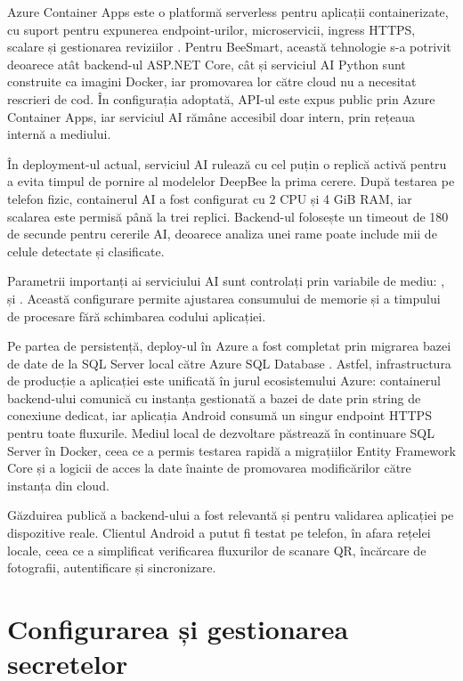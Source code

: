 Azure Container Apps este o platformă serverless pentru aplicații containerizate, cu suport pentru expunerea endpoint-urilor, microservicii, ingress HTTPS, scalare și gestionarea reviziilor \cite{azureContainerAppsDocs}. Pentru BeeSmart, această tehnologie s-a potrivit deoarece atât backend-ul ASP.NET Core, cât și serviciul AI Python sunt construite ca imagini Docker, iar promovarea lor către cloud nu a necesitat rescrieri de cod. În configurația adoptată, API-ul este expus public prin Azure Container Apps, iar serviciul AI rămâne accesibil doar intern, prin rețeaua internă a mediului.

În deployment-ul actual, serviciul AI rulează cu cel puțin o replică activă pentru a evita timpul de pornire al modelelor DeepBee la prima cerere. După testarea pe telefon fizic, containerul AI a fost configurat cu 2 CPU și 4 GiB RAM, iar scalarea este permisă până la trei replici. Backend-ul folosește un timeout de 180 de secunde pentru cererile AI, deoarece analiza unei rame poate include mii de celule detectate și clasificate.

Parametrii importanți ai serviciului AI sunt controlați prin variabile de mediu: ,  și . Această configurare permite ajustarea consumului de memorie și a timpului de procesare fără schimbarea codului aplicației.

Pe partea de persistență, deploy-ul în Azure a fost completat prin migrarea bazei de date de la SQL Server local către Azure SQL Database \cite{azureSqlDocs}. Astfel, infrastructura de producție a aplicației este unificată în jurul ecosistemului Azure: containerul backend-ului comunică cu instanța gestionată a bazei de date prin string de conexiune dedicat, iar aplicația Android consumă un singur endpoint HTTPS pentru toate fluxurile. Mediul local de dezvoltare păstrează în continuare SQL Server în Docker, ceea ce a permis testarea rapidă a migrațiilor Entity Framework Core și a logicii de acces la date înainte de promovarea modificărilor către instanța din cloud.

Găzduirea publică a backend-ului a fost relevantă și pentru validarea aplicației pe dispozitive reale. Clientul Android a putut fi testat pe telefon, în afara rețelei locale, ceea ce a simplificat verificarea fluxurilor de scanare QR, încărcare de fotografii, autentificare și sincronizare.

\section{Configurarea și gestionarea secretelor}

